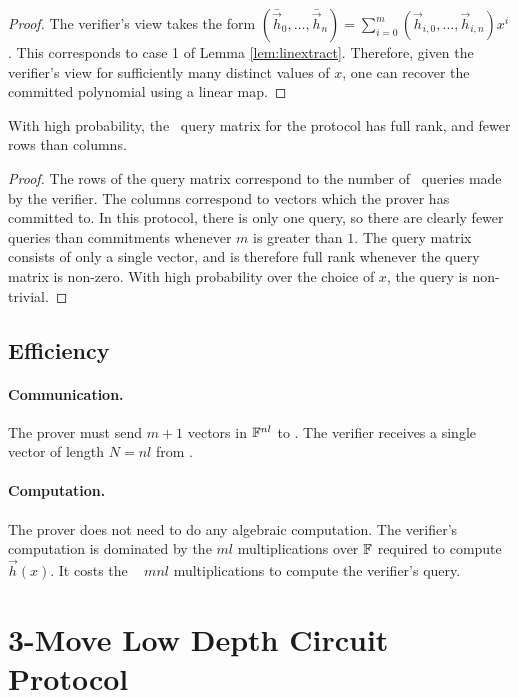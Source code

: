 \begin{proof}
The verifier's view takes the form $(\bar{\vec{h}}_0,\ldots,\bar{\vec{h}}_n) = \sum_{i=0}^{m} (\vec{h}_{i,0},\ldots,\vec{h}_{i,n}) x^i$. This corresponds to case 1 of Lemma \ref{lem:linextract}. Therefore, given the verifier's view for sufficiently many distinct values of $x$, one can recover the committed polynomial using a linear map.
\end{proof}

\begin{lemma}
With high probability, the \ILC\ query matrix for the protocol has full rank, and fewer rows than columns.
\end{lemma}

\begin{proof}
The rows of the query matrix correspond to the number of \ILC\ queries made by the verifier. The columns correspond to vectors which the prover has committed to. In this protocol, there is only one query, so there are clearly fewer queries than commitments whenever $m$ is greater than $1$. The query matrix consists of only a single vector, and is therefore full rank whenever the query matrix is non-zero. With high probability over the choice of $x$, the query is non-trivial.
\end{proof}

\subsection{Efficiency}

\paragraph{Communication.} The prover must send $m+1$ vectors in $\mathbb{F}^{nl}$ to \ILC. The verifier receives a single vector of length $N = nl$ from \ILC.

\paragraph{Computation.} The prover does not need to do any algebraic computation. The verifier's computation is dominated by the $ml$ multiplications over $\mathbb{F}$ required to compute $\vec{h}(x)$. It costs the \ILC~ $mnl$ multiplications to compute the verifier's query.

\section{3-Move Low Depth Circuit Protocol} \label{subsec:3rndlowdeg}

